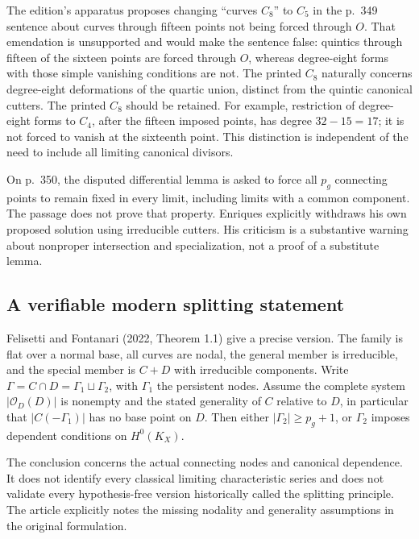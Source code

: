 The edition's apparatus proposes changing ``curves \(C_8\)'' to \(C_5\) in the p.~349 sentence about curves through fifteen points not being forced through \(O\). That emendation is unsupported and would make the sentence false: quintics through fifteen of the sixteen points are forced through \(O\), whereas degree-eight forms with those simple vanishing conditions are not. The printed \(C_8\) naturally concerns degree-eight deformations of the quartic union, distinct from the quintic canonical cutters. The printed \(C_8\) should be retained. For example, restriction of degree-eight forms to \(C_4\), after the fifteen imposed points, has degree \(32-15=17\); it is not forced to vanish at the sixteenth point. This distinction is independent of the need to include all limiting canonical divisors.

On p.~350, the disputed differential lemma is asked to force all \(p_g\) connecting points to remain fixed in every limit, including limits with a common component. The passage does not prove that property. Enriques explicitly withdraws his own proposed solution using irreducible cutters. His criticism is a substantive warning about nonproper intersection and specialization, not a proof of a substitute lemma.

\subsection{A verifiable modern splitting statement}\label{cp2-ix-7-2}

Felisetti and Fontanari (2022, Theorem 1.1) give a precise version. The family is flat over a normal base, all curves are nodal, the general member is irreducible, and the special member is \(C+D\) with irreducible components. Write \(\Gamma=C\cap D=\Gamma_1\sqcup\Gamma_2\), with \(\Gamma_1\) the persistent nodes. Assume the complete system \(\vert \mathcal O_D(D)\vert \) is nonempty and the stated generality of \(C\) relative to \(D\), in particular that \(\vert C(-\Gamma_1)\vert \) has no base point on \(D\). Then either \(\vert \Gamma_2\vert \geq p_g+1\), or \(\Gamma_2\) imposes dependent conditions on \(H^0(K_X)\).

The conclusion concerns the actual connecting nodes and canonical dependence. It does not identify every classical limiting characteristic series and does not validate every hypothesis-free version historically called the splitting principle. The article explicitly notes the missing nodality and generality assumptions in the original formulation.

